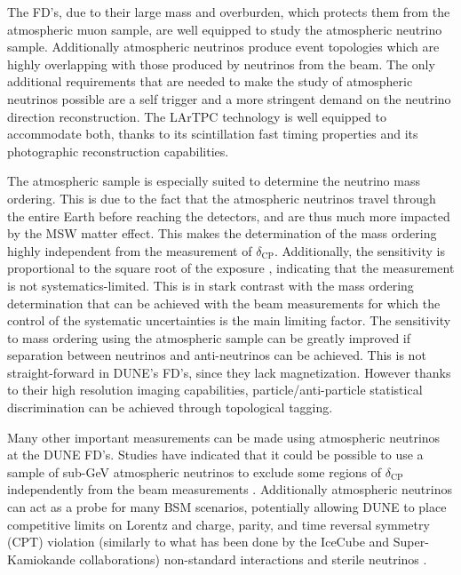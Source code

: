 The FD's, due to their large mass and overburden, which protects them from the atmospheric muon sample, are well equipped to study the atmospheric neutrino sample. Additionally atmospheric neutrinos produce event topologies which are highly overlapping with those produced by neutrinos from the beam. The only additional requirements that are needed to make the study of atmospheric neutrinos possible are a self trigger and  a more stringent demand on the neutrino direction reconstruction. The LArTPC technology is well equipped to accommodate both, thanks to its scintillation fast timing properties and its photographic reconstruction capabilities.

The atmospheric sample is especially suited to determine the neutrino mass ordering. This is due to the fact that the atmospheric neutrinos travel through the entire Earth before reaching the detectors, and are thus much more impacted by the MSW matter effect. This makes the determination of the mass ordering highly independent from the measurement of $\delta_\text{CP}$. Additionally, the sensitivity is proportional to the square root of the exposure \cite{DUNE:2020TDR1, Ternes:2019sak} , indicating that the measurement is not systematics-limited. This is in stark contrast with the mass ordering determination that can be achieved with the beam measurements for which the control of the systematic uncertainties is the main limiting factor. The sensitivity to mass ordering using the atmospheric sample can be greatly improved if separation between neutrinos and anti-neutrinos can be achieved. This is not straight-forward in DUNE's FD's, since they lack magnetization. However thanks to their high resolution imaging capabilities, particle/anti-particle statistical discrimination can be achieved through topological tagging. 

Many other important measurements can be made using atmospheric neutrinos at the DUNE FD's. Studies have indicated that it could be possible to use a sample of sub-GeV atmospheric neutrinos to exclude some regions of $\delta_\text{CP}$ independently from the beam measurements \cite{Kelly:2019itm}. Additionally atmospheric neutrinos can act as a probe for many BSM scenarios, potentially allowing DUNE to place competitive limits on Lorentz and charge, parity, and time reversal symmetry (CPT) violation (similarly to what has been done by the IceCube \cite{IceCube:2010fyu,IceCube:2017qyp} and Super-Kamiokande \cite{Super-Kamiokande:2014exs} collaborations) non-standard interactions \cite{Chatterjee:2014gxa} and sterile neutrinos \cite{Super-Kamiokande:2014ndf}.
